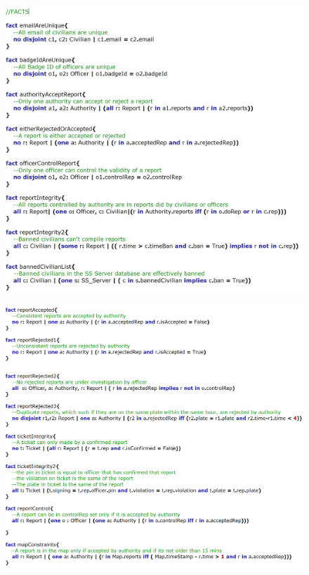 \documentclass[12pt,a4paper]{article}
\begin{document}
\begin{figure}[H]
\begin{adjustwidth}{-25mm}{-25mm}
				\centering
				\includegraphics[width=.75\paperwidth,height=.75\paperheight, keepaspectratio]{Images/Alloy/facts1}
\end{adjustwidth}
\end{figure}
\begin{figure}[H]
\begin{adjustwidth}{-25mm}{-25mm}
				\centering
				\includegraphics[width=.85\paperwidth,height=.85\paperheight, keepaspectratio]{Images/Alloy/facts2}
\end{adjustwidth}
\end{figure}
\end{document}
